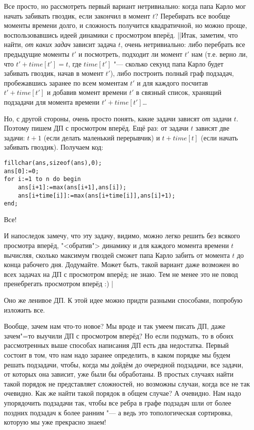 Все просто, но рассмотреть первый вариант 
нетривиально: когда папа Карло мог начать забивать гвоздик, если закончил в момент $t$? Перебирать 
все вообще моменты времени долго, и сложность получится квадратичной, но можно проще, 
воспользовавшись идеей динамики с просмотром вперёд.
||Итак, заметим, что найти, \textit{от каких задач} зависит задача $t$, очень нетривиально: либо
перебрать все предыдущие моменты $t'$ и посмотреть, подходит ли момент $t'$ нам (т.е. верно ли, что 
$t'+time[t']=t$, где $time[t']$ "--- сколько секунд папа Карло будет забивать гвоздик, начав в 
момент $t'$), либо построить полный граф подзадач, пробежавшись заранее по всем моментам $t'$ и для 
каждого посчитав $t'+time[t']$ и добавив момент времени $t'$ в связный список, хранящий подзадачи 
для момента времени $t'+time[t']$\dots

Но, с другой стороны, очень просто понять, какие задачи зависят \textit{от} задачи $t$. Поэтому 
пишем ДП с просмотром вперёд. Ещё раз: от задачи $t$ зависят две задачи: $t+1$ (если делать 
маленький перерывчик) и $t+time[t]$ (если начать забивать гвоздик). Получаем код:
\begin{codesampleo}\begin{verbatim}
fillchar(ans,sizeof(ans),0);
ans[0]:=0;
for i:=1 to n do begin
    ans[i+1]:=max(ans[i+1],ans[i]); 
    ans[i+time[i]]:=max(ans[i+time[i]],ans[i]+1);
end;
\end{verbatim}
\end{codesampleo}
Все!

И напоследок замечу, что эту задачу, видимо, можно легко решить без всякого просмотра вперёд, 
"<обратив"> динамику и для каждого момента времени $t$ вычисляя, сколько максимум гвоздей сможет 
папа Карло забить от момента $t$ до конца рабочего дня. Додумайте. Может быть, такой вариант даже 
возможен во всех задачах на ДП с просмотром вперёд; не знаю. Тем не менее это не повод пренебрегать 
просмотром вперёд :)
|\label{buratino}

 Оно же ленивое ДП.
К этой идее можно придти разными способами, попробую изложить все.

Вообще, зачем нам что-то новое? Мы вроде и так умеем писать ДП, даже зачем"=то выучили ДП с 
просмотром вперёд? Но если подумать, то в обоих рассмотренных выше способах написания ДП есть два 
недостатка. Первый состоит в том, что нам надо заранее определить, в каком порядке мы будем решать 
подзадачи, чтобы, когда мы дойдём до очередной подзадачи, все задачи, от которых она зависит, уже 
были бы обработаны. В простых случаях найти такой порядок не представляет сложностей, но возможны 
случаи, когда все не так очевидно. Как же найти такой порядок в общем случае? А очевидно. Нам надо 
упорядочить подзадачи так, чтобы все ребра в графе подзадач шли от более поздних подзадач к более 
ранним "--- а ведь это топологическая сортировка, которую мы уже прекрасно знаем!

